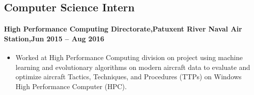 \subsection{Computer Science Intern}
\paragraph{High Performance Computing Directorate,Patuxent River Naval Air Station,Jun 2015 -- Aug 2016}
\begin{itemize}
    \item Worked at High Performance Computing division on project using machine learning and evolutionary algorithms on modern aircraft data to evaluate and optimize aircraft Tactics, Techniques, and Procedures (TTPs) on Windows High Performance Computer (HPC).
\end{itemize}
